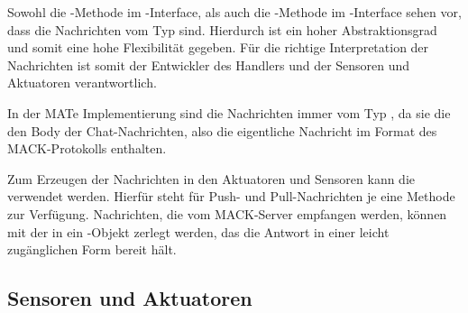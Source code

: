 Sowohl die -Methode im -Interface, als auch die -Methode im -Interface sehen vor, dass die Nachrichten vom Typ  sind. Hierdurch ist ein hoher Abstraktionsgrad und somit eine hohe Flexibilität gegeben. Für die richtige Interpretation der Nachrichten ist somit der Entwickler des Handlers und der Sensoren und Aktuatoren verantwortlich.

In der MATe Implementierung sind die Nachrichten immer vom Typ , da sie die den Body der Chat-Nachrichten, also die eigentliche Nachricht im Format des MACK-Protokolls enthalten.

Zum Erzeugen der Nachrichten in den Aktuatoren und Sensoren kann die  verwendet werden. Hierfür steht für Push- und Pull-Nachrichten je eine Methode zur Verfügung. Nachrichten, die vom MACK-Server empfangen werden, können mit der  in ein -Objekt zerlegt werden, das die Antwort in einer leicht zugänglichen Form bereit hält.

\subsection{Sensoren und Aktuatoren}\label{subsec:real_sensors}




